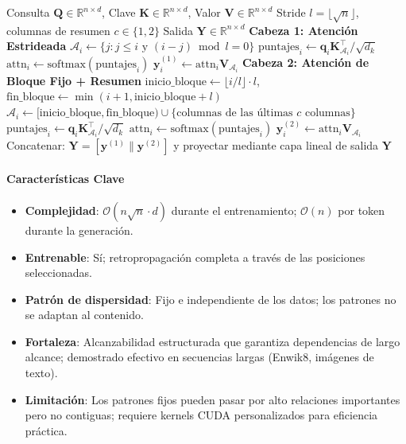 \begin{algorithm}[H]
\caption{Atención Sparse Transformer: Cabezas Duales Estrideada + Fija}
\begin{algorithmic}[1]
\Require Consulta $\mathbf{Q} \in \mathbb{R}^{n \times d}$, Clave $\mathbf{K} \in \mathbb{R}^{n \times d}$, Valor $\mathbf{V} \in \mathbb{R}^{n \times d}$
\Require Stride $l = \lfloor\sqrt{n}\rfloor$, columnas de resumen $c \in \{1, 2\}$
\Ensure Salida $\mathbf{Y} \in \mathbb{R}^{n \times d}$
\State \textbf{Cabeza 1: Atención Estrideada}
    \State $\mathcal{A}_i \gets \{j : j \leq i \text{ y } (i-j) \bmod l = 0\}$ 
    \State $\text{puntajes}_{i} \gets \mathbf{q}_i \mathbf{K}_{\mathcal{A}_i}^\top / \sqrt{d_k}$
    \State $\text{attn}_{i} \gets \text{softmax}(\text{puntajes}_{i})$
    \State $\mathbf{y}_i^{(1)} \gets \text{attn}_{i} \mathbf{V}_{\mathcal{A}_i}$
\EndFor
\State \textbf{Cabeza 2: Atención de Bloque Fijo + Resumen}
    \State $\text{inicio\_bloque} \gets \lfloor i/l \rfloor \cdot l$, $\text{fin\_bloque} \gets \min(i+1, \text{inicio\_bloque}+l)$
    \State $\mathcal{A}_i \gets [\text{inicio\_bloque}, \text{fin\_bloque}) \cup \{\text{columnas de las últimas } c \text{ columnas}\}$
    \State $\text{puntajes}_{i} \gets \mathbf{q}_i \mathbf{K}_{\mathcal{A}_i}^\top / \sqrt{d_k}$
    \State $\text{attn}_{i} \gets \text{softmax}(\text{puntajes}_{i})$
    \State $\mathbf{y}_i^{(2)} \gets \text{attn}_{i} \mathbf{V}_{\mathcal{A}_i}$
\EndFor
\State Concatenar: $\mathbf{Y} = [\mathbf{y}^{(1)} \| \mathbf{y}^{(2)}]$ y proyectar mediante capa lineal de salida
\Return $\mathbf{Y}$
\end{algorithmic}
\end{algorithm}

\paragraph{Características Clave}

\begin{itemize}[leftmargin=*]
    \item \textbf{Complejidad}: $\mathcal{O}(n\sqrt{n} \cdot d)$ durante el entrenamiento; $\mathcal{O}(n)$ por token durante la generación.
    \item \textbf{Entrenable}: Sí; retropropagación completa a través de las posiciones seleccionadas.
    \item \textbf{Patrón de dispersidad}: Fijo e independiente de los datos; los patrones no se adaptan al contenido.
    \item \textbf{Fortaleza}: Alcanzabilidad estructurada que garantiza dependencias de largo alcance; demostrado efectivo en secuencias largas (Enwik8, imágenes de texto).
    \item \textbf{Limitación}: Los patrones fijos pueden pasar por alto relaciones importantes pero no contiguas; requiere kernels CUDA personalizados para eficiencia práctica.
\end{itemize}

